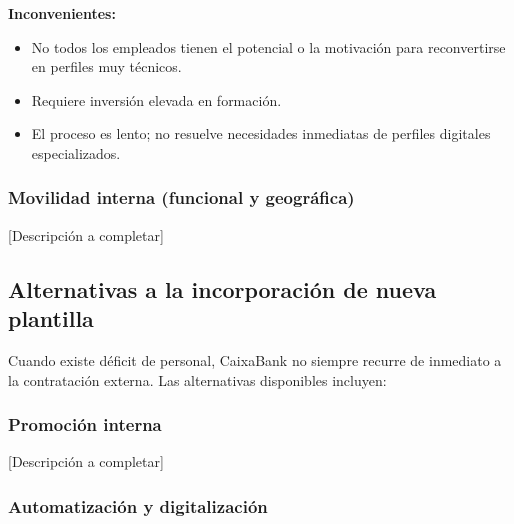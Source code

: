 \textbf{Inconvenientes:}
\begin{itemize}
  \item No todos los empleados tienen el potencial o la motivación para
        reconvertirse en perfiles muy técnicos.
  \item Requiere inversión elevada en formación.
  \item El proceso es lento; no resuelve necesidades inmediatas de
        perfiles digitales especializados.
\end{itemize}

\subsubsection{Movilidad interna (funcional y geográfica)}


[Descripción a completar]

\subsection{Alternativas a la incorporación de nueva plantilla}

Cuando existe déficit de personal, CaixaBank no siempre recurre de inmediato
a la contratación externa. Las alternativas disponibles incluyen:

\subsubsection{Promoción interna}


[Descripción a completar]

\subsubsection{Automatización y digitalización}


